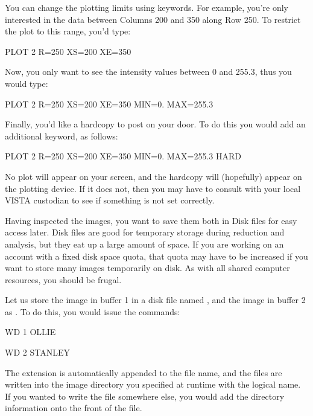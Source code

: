 {You can change the plotting limits using keywords.  For example, you're only
interested in the data between Columns 200 and 350 along Row 250.  To restrict
the plot to this range, you'd type:

\begin{command}
    \item PLOT 2 R=250 XS=200 XE=350
\end{command}

Now, you only want to see the intensity values between 0 and 255.3, thus you
would type:

\begin{command}
    \item PLOT 2 R=250 XS=200 XE=350 MIN=0. MAX=255.3
\end{command}

Finally, you'd like a hardcopy to post on your door.  To do this you would add
an additional keyword,  as follows:

\begin{command}
  \item PLOT 2 R=250 XS=200 XE=350 MIN=0. MAX=255.3 HARD
\end{command}

\noindent No plot will appear on your screen, and the hardcopy will
(hopefully) appear on the plotting device.  If it does not, then you may have
to consult with your local VISTA custodian to see if something is not set
correctly.

\medskip

\nobreak
Having inspected the images, you want to save them both in Disk files for easy
access later.  Disk files are good for temporary storage during reduction and
analysis, but they eat up a large amount of space.  If you are working on an
account with a fixed disk space quota, that quota may have to be increased if
you want to store many images temporarily on disk.  As with all shared
computer resources, you should be frugal.

Let us store the image in buffer 1 in a disk file named ,
and the image in buffer 2 as .  To do this, you would
issue the commands:

\begin{command}
      \item WD 1 OLLIE
      \item WD 2 STANLEY
\end{command}

\noindent The  extension is automatically appended to the file
name, and the files are written into the image directory you specified at
runtime with the  logical name.  If you wanted to write the
file somewhere else, you would add the directory information onto the front of
the file.

}
